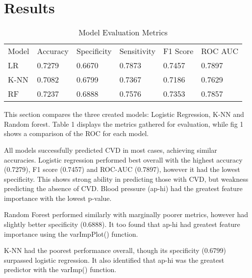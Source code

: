 \documentclass[conference]{IEEEtran}
\begin{document}
\section{Results}
\begin{table}[]
\caption{Model Evaluation Metrics}
\begin{tabular}{llllll}
Model               & Accuracy & Specificity & Sensitivity & F1 Score & ROC AUC \\
LR & 0.7279   & 0.6670      & 0.7873      & 0.7457   & 0.7897  \\
K-NN                & 0.7082   & 0.6799      & 0.7367      & 0.7186   & 0.7629  \\
RF       & 0.7237   & 0.6888      & 0.7576      & 0.7353   & 0.7857
\end{tabular}
\end{table}

This section compares the three created models: Logistic Regression, K-NN and Random forest.
Table 1 displays the metrics gathered for evaluation, while fig 1 shows a comparison of the ROC for each model.

All models successfully predicted CVD in most cases, achieving similar accuracies. Logistic regression performed best overall with the highest accuracy (0.7279), F1 score (0.7457) and ROC-AUC (0.7897), however it had the lowest specificity. This shows strong ability in predicting those with CVD, but weakness predicting the absence of CVD. Blood pressure (ap-hi) had the greatest feature importance with the lowest p-value. %

Random Forest performed similarly with marginally poorer metrics, however had slightly better specificity (0.6888). It too found that ap-hi had greatest feature importance using the varImpPlot() function.

K-NN had the poorest performance overall, though its specificity (0.6799) surpassed logistic regression. It also identified that ap-hi was the greatest predictor with the varImp() function.
\end{document}
